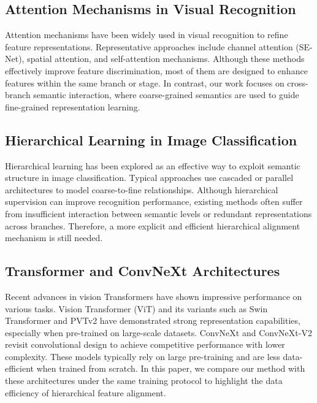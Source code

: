 \documentclass[pdflatex,sn-mathphys-num]{sn-jnl}
\theoremstyle{thmstyleone}%
\theoremstyle{thmstyletwo}%
\theoremstyle{thmstylethree}%
\begin{document}
\subsection{Attention Mechanisms in Visual Recognition}
Attention mechanisms have been widely used in visual recognition to refine feature representations. 
Representative approaches include channel attention (SE-Net), spatial attention, and self-attention mechanisms. 
Although these methods effectively improve feature discrimination, most of them are designed to enhance features within the same branch or stage. 
In contrast, our work focuses on cross-branch semantic interaction, where coarse-grained semantics are used to guide fine-grained representation learning.

\subsection{Hierarchical Learning in Image Classification}
Hierarchical learning has been explored as an effective way to exploit semantic structure in image classification. 
Typical approaches use cascaded or parallel architectures to model coarse-to-fine relationships. 
Although hierarchical supervision can improve recognition performance, existing methods often suffer from insufficient interaction between semantic levels or redundant representations across branches. 
Therefore, a more explicit and efficient hierarchical alignment mechanism is still needed.

\subsection{Transformer and ConvNeXt Architectures}
Recent advances in vision Transformers have shown impressive performance on various tasks. 
Vision Transformer (ViT) \cite{dosovitskiy2020image} and its variants such as Swin Transformer \cite{liu2021swin} and PVTv2 \cite{wang2022pvt} have demonstrated strong representation capabilities, especially when pre-trained on large-scale datasets. 
ConvNeXt \cite{liu2022convnext} and ConvNeXt-V2 \cite{woo2023convnextv2} revisit convolutional design to achieve competitive performance with lower complexity. 
These models typically rely on large pre-training and are less data-efficient when trained from scratch. 
In this paper, we compare our method with these architectures under the same training protocol to highlight the data efficiency of hierarchical feature alignment.
\end{document}
